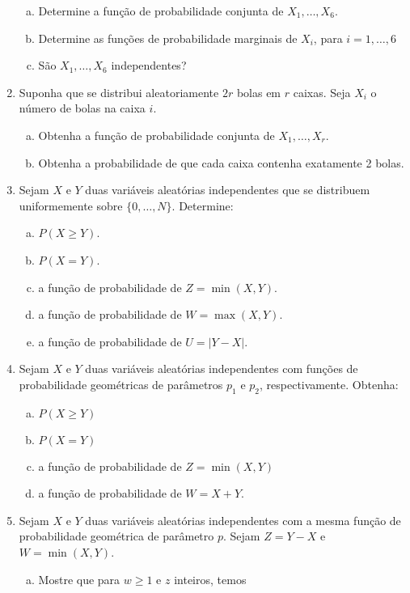 \documentclass[../Notas.tex]{subfiles}
\begin{document}
\begin{enumerate}
\begin{enumerate}[a)]
    \item Determine a função de probabilidade conjunta de $X_1, \dots, X_6$.
    \item Determine as funções de probabilidade marginais de $X_i$, para $i=1,\dots,6$
    \item São $X_1, \dots, X_6$ independentes?
    \end{enumerate}
    \item Suponha que se distribui aleatoriamente $2r$ bolas em $r$ caixas. Seja $X_i$ o número de bolas na caixa $i$.
    \begin{enumerate}[a)]
    \item Obtenha a função de probabilidade conjunta de $X_1, \dots, X_r$.
    \item Obtenha a probabilidade de que cada caixa contenha exatamente 2 bolas.
    \end{enumerate}
    \item Sejam $X$ e $Y$ duas variáveis aleatórias independentes que se distribuem uniformemente sobre $\{0, \dots, N\}$. Determine:
    \begin{enumerate}[a)]
    \item $P(X\geq Y)$.
    \item $P(X=Y)$.
    \item a função de probabilidade de $Z = \min(X,Y)$.
    \item a função de probabilidade de $W = \max(X,Y)$.
    \item a função de probabilidade de $U = |Y-X|$.
    \end{enumerate}
    \item Sejam $X$ e $Y$ duas variáveis aleatórias independentes com funções de probabilidade geométricas de parâmetros $p_1$ e $p_2$, respectivamente. Obtenha:
    \begin{enumerate}[a)]
    \item $P(X\geq Y)$
    \item $P(X=Y)$
    \item a função de probabilidade de $Z=\min(X,Y)$
    \item a função de probabilidade de $W = X+Y$.
    \end{enumerate}
    \item Sejam $X$ e $Y$ duas variáveis aleatórias independentes com a mesma função de probabilidade geométrica de parâmetro $p$. Sejam $Z=Y-X$ e $W=\min(X,Y)$.
    \begin{enumerate}[a)]
    \item Mostre que para $w\geq 1$ e $z$ inteiros, temos

\end{enumerate}
\end{enumerate}
\end{document}

